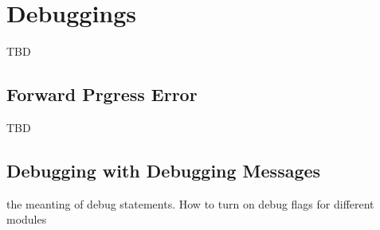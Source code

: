 

\chapter{Debuggings}
\label{sec:debugging}
TBD 
\section{Forward Prgress Error}
TBD 
\section{Debugging with Debugging Messages}
the meanting of debug statements. 
How to turn on debug flags for different modules


